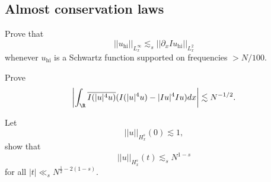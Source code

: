 \begin{statement}

\end{statement}

\begin{solution}

\end{solution}

\subsection{Almost conservation laws}

\begin{statement}
	Prove that 
		\[ ||u_{\text{hi}}||_{L^\infty_x} \lesssim_s ||\partial_x I u_{\text{hi}}||_{L^2_x} \]
	whenever $u_{\text{hi}}$ is a Schwartz function supported on frequencies $> N/100$. 	
\end{statement}

\begin{solution}

\end{solution}

\begin{statement}
	Prove
		\[ \left| \int_\R \overline{I(|u|^4 u)} (I(|u|^4 u) - |Iu|^4 Iu) dx \right| \lesssim N^{-1/2}. \]
\end{statement}

\begin{solution}

\end{solution}

\begin{statement}
	Let
		\[ ||u||_{H^s_x} (0) \lesssim 1, \]
	show that 
		\[ ||u||_{H^s_x} (t) \lesssim_s N^{1 - s} \]
	for all $|t| \ll_s N^{\frac12 - 2(1 - s)}$. 		
\end{statement}

\begin{solution}

\end{solution}

